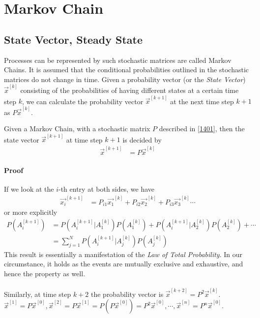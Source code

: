 \section{Markov Chain}

\subsection{State Vector, Steady State}

Processes can be represented by such stochastic matrices are called Markov Chains. It is assumed that the conditional probabilities outlined in the stochastic matrices do not change in time. Given a probability vector (or the \textit{State Vector}) $\vec{x}^{[k]}$ consisting of the probabilities of having different states at a certain time step $k$, we can calculate the probability vector $\vec{x}^{[k+1]}$ at the next time step $k+1$ as $P\vec{x}^{[k]}$.

\begin{proper}
Given a Markov Chain, with a stochastic matrix $P$ described in \ref{1401}, then the state vector $\vec{x}^{[k+1]}$ at time step $k+1$ is decided by
\begin{align*}
\vec{x}^{[k+1]} &= P\vec{x}^{[k]}   
\end{align*}
\end{proper}
\paragraph{Proof} If we look at the $i$-th entry at both sides, we have
\begin{align*}
\vec{x_i}^{[k+1]} &= P_{i1} \vec{x_1}^{[k]} + P_{i2} \vec{x_2}^{[k]} + P_{i3} \vec{x_3}^{[k]} \cdots 
\end{align*}
or more explicitly
\begin{align*}
P(A_i^{[k+1]}) &= P(A_i^{[k+1]}|A_1^{[k]}) P(A_1^{[k]}) + P(A_i^{[k+1]}|A_2^{[k]}) P(A_2^{[k]}) + \cdots \\
&= \sum_{j=1}^N P(A_i^{[k+1]}|A_j^{[k]}) P(A_j^{[k]})
\end{align*}
This result is essentially a manifestation of the \textit{Law of Total Probability}. In our circumstance, it holds as the events are mutually exclusive and exhaustive, and hence the property as well.\\
\\
Similarly, at time step $k+2$ the probability vector is $\vec{x}^{[k+2]} = P^2\vec{x}^{[k]}$. $\vec{x}^{[1]} = P\vec{x}^{[0]}, \vec{x}^{[2]} = P\vec{x}^{[1]} = P(P\vec{x}^{[0]}) = P^2\vec{x}^{[0]}, \cdots, \vec{x}^{[n]} = P^n\vec{x}^{[0]}$.

